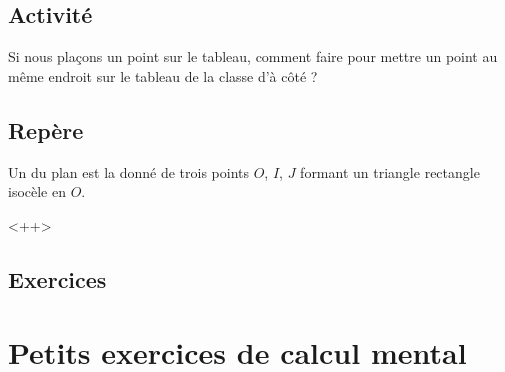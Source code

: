 \subsection{Activité}

Si nous plaçons un point sur le tableau, comment faire pour mettre un point au même endroit sur le tableau de la classe d'à côté ?

\subsection{Repère}

\begin{definition}
    Un  du plan est la donné de trois points \( O\), \( I\), \( J\) formant un triangle rectangle isocèle en  \( O\).
\end{definition}
<++>

\subsection{Exercices}


\section{Petits exercices de calcul mental}

